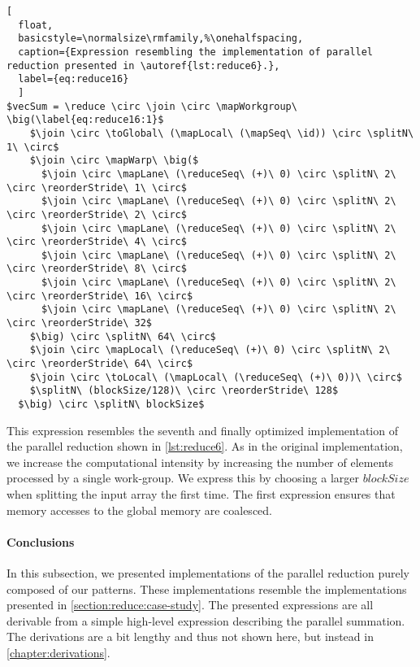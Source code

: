 \begin{lstlisting}[
  float,
  basicstyle=\normalsize\rmfamily,%\onehalfspacing,
  caption={Expression resembling the implementation of parallel reduction presented in \autoref{lst:reduce6}.},
  label={eq:reduce16}
  ]
$vecSum = \reduce \circ \join \circ \mapWorkgroup\ \big(\label{eq:reduce16:1}$
    $\join \circ \toGlobal\ (\mapLocal\ (\mapSeq\ \id)) \circ \splitN\ 1\ \circ$
    $\join \circ \mapWarp\ \big($
      $\join \circ \mapLane\ (\reduceSeq\ (+)\ 0) \circ \splitN\ 2\ \circ \reorderStride\ 1\ \circ$
      $\join \circ \mapLane\ (\reduceSeq\ (+)\ 0) \circ \splitN\ 2\ \circ \reorderStride\ 2\ \circ$
      $\join \circ \mapLane\ (\reduceSeq\ (+)\ 0) \circ \splitN\ 2\ \circ \reorderStride\ 4\ \circ$
      $\join \circ \mapLane\ (\reduceSeq\ (+)\ 0) \circ \splitN\ 2\ \circ \reorderStride\ 8\ \circ$
      $\join \circ \mapLane\ (\reduceSeq\ (+)\ 0) \circ \splitN\ 2\ \circ \reorderStride\ 16\ \circ$
      $\join \circ \mapLane\ (\reduceSeq\ (+)\ 0) \circ \splitN\ 2\ \circ \reorderStride\ 32$
    $\big) \circ \splitN\ 64\ \circ$
    $\join \circ \mapLocal\ (\reduceSeq\ (+)\ 0) \circ \splitN\ 2\ \circ \reorderStride\ 64\ \circ$
    $\join \circ \toLocal\ (\mapLocal\ (\reduceSeq\ (+)\ 0))\ \circ$
    $\splitN\ (blockSize/128)\ \circ \reorderStride\ 128$
  $\big) \circ \splitN\ blockSize$
\end{lstlisting}
%
This expression resembles the seventh and finally optimized implementation of the parallel reduction shown in \autoref{lst:reduce6}.
As in the original \OpenCL implementation, we increase the computational intensity by increasing the number of elements processed by a single work-group.
We express this by choosing a larger $blockSize$ when splitting the input array the first time.
The first \reorderStride expression ensures that memory accesses to the global memory are coalesced.


\paragraph{Conclusions}
In this subsection, we presented implementations of the parallel reduction purely composed of our patterns.
These implementations resemble the \OpenCL implementations presented in \autoref{section:reduce:case-study}.
The presented expressions are all derivable from a simple high-level expression describing the parallel summation.
The derivations are a bit lengthy and thus not shown here, but instead in \autoref{chapter:derivations}.

